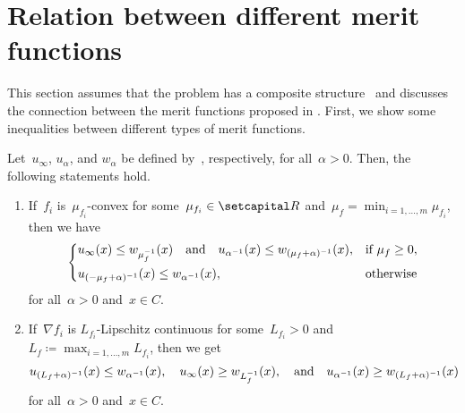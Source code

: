 \documentclass[../main]{subfiles}
\begin{document}
\section{Relation between different merit functions} 
This section assumes that the problem has a composite structure~ and discusses the connection between the merit functions proposed in .
First, we show some inequalities between different types of merit functions.
\begin{theorem} 
    Let~$u_\infty$, $u_\alpha$, and $w_\alpha$ be defined by~, respectively, for all~$\alpha > 0$.
    Then, the following statements hold.
    \begin{enumerate}
        \item If~$f_i$ is~$\mu_{f_i}$-convex for some~$\mu_{f_i} \in \setR$ and~$\mu_f = \min_{i = 1, \dots, m} \mu_{f_i}$, then we have
              \begin{equation}
                  \begin{dcases}
                      u_\infty(x) \le w_{\mu_f^{-1}}(x) \quad \text{and} \quad u_{\alpha^{-1}}(x) \le w_{(\mu_f + \alpha)^{-1}}(x), & \text{if } \mu_f \ge 0, \\
                      u_{(- \mu_f + \alpha)^{-1}}(x) \le w_{\alpha^{-1}}(x),                                        & \text{otherwise}
                  \end{dcases}
              \end{equation}
              for all~$\alpha > 0$ and~$x \in C$. 

        \item If~$\nabla f_i$ is $L_{f_i}$-Lipschitz continuous for some~$L_{f_i} > 0$ and~$L_f \coloneqq \max_{i = 1, \dots, m} L_{f_i}$, then we get
              \begin{equation}
                  u_{(L_f + \alpha)^{-1}}(x) \le w_{\alpha^{-1}}(x), \quad u_\infty(x) \ge w_{L_f^{-1}}(x), \quad \text{and} \quad u_{\alpha^{-1}}(x) \ge w_{(L_f + \alpha)^{-1}}(x)
              \end{equation}
              for all~$\alpha > 0$ and~$x \in C$.
    \end{enumerate}
\end{theorem}
\end{document}
